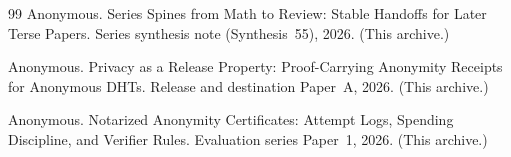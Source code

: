 \documentclass[11pt]{article}
\begin{document}
\begin{thebibliography}{99}
Anonymous.
\newblock Series Spines from Math to Review: Stable Handoffs for Later Terse Papers.
\newblock Series synthesis note (Synthesis~55), 2026. (This archive.)

Anonymous.
\newblock Privacy as a Release Property: Proof-Carrying Anonymity Receipts for Anonymous DHTs.
\newblock Release and destination Paper~A, 2026. (This archive.)



Anonymous.
\newblock Notarized Anonymity Certificates: Attempt Logs, Spending Discipline, and Verifier Rules.
\newblock Evaluation series Paper~1, 2026. (This archive.)

\end{thebibliography}
\end{document}
